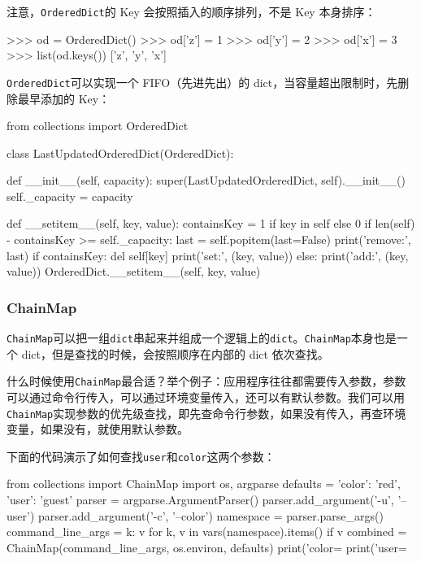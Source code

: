 注意，\texttt{OrderedDict}的 Key 会按照插入的顺序排列，不是 Key
本身排序：

\begin{pythoncode}
>>> od = OrderedDict()
>>> od['z'] = 1
>>> od['y'] = 2
>>> od['x'] = 3
>>> list(od.keys()) 
['z', 'y', 'x']
\end{pythoncode}

\texttt{OrderedDict}可以实现一个 FIFO（先进先出）的
dict，当容量超出限制时，先删除最早添加的 Key：

\begin{pythoncode}
from collections import OrderedDict

class LastUpdatedOrderedDict(OrderedDict):

    def __init__(self, capacity):
        super(LastUpdatedOrderedDict, self).__init__()
        self._capacity = capacity

    def __setitem__(self, key, value):
        containsKey = 1 if key in self else 0
        if len(self) - containsKey >= self._capacity:
            last = self.popitem(last=False)
            print('remove:', last)
        if containsKey:
            del self[key]
            print('set:', (key, value))
        else:
            print('add:', (key, value))
        OrderedDict.__setitem__(self, key, value)
\end{pythoncode}

\hypertarget{chainmap}{%
\subsubsection{ChainMap}\label{chainmap}}

\texttt{ChainMap}可以把一组\texttt{dict}串起来并组成一个逻辑上的\texttt{dict}。\texttt{ChainMap}本身也是一个
dict，但是查找的时候，会按照顺序在内部的 dict 依次查找。

什么时候使用\texttt{ChainMap}最合适？举个例子：应用程序往往都需要传入参数，参数可以通过命令行传入，可以通过环境变量传入，还可以有默认参数。我们可以用\texttt{ChainMap}实现参数的优先级查找，即先查命令行参数，如果没有传入，再查环境变量，如果没有，就使用默认参数。

下面的代码演示了如何查找\texttt{user}和\texttt{color}这两个参数：

\begin{pythoncode}
from collections import ChainMap
import os, argparse
defaults = {
    'color': 'red',
    'user': 'guest'
}
parser = argparse.ArgumentParser()
parser.add_argument('-u', '--user')
parser.add_argument('-c', '--color')
namespace = parser.parse_args()
command_line_args = { k: v for k, v in vars(namespace).items() if v }
combined = ChainMap(command_line_args, os.environ, defaults)
print('color=%
print('user=%
\end{pythoncode}

